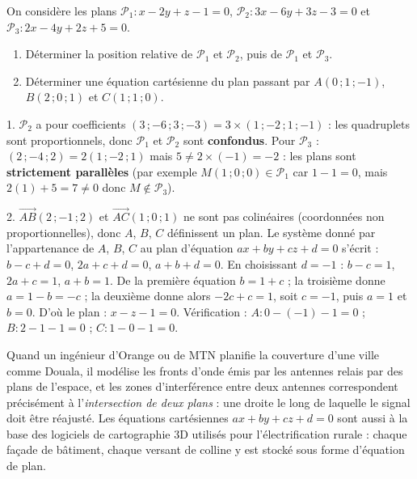 \documentclass[11pt]{article}
\begin{document}
\begin{exercice}
On considère les plans $\mathcal{P}_1 : x - 2y + z - 1 = 0$, $\mathcal{P}_2 : 3x - 6y + 3z - 3 = 0$ et $\mathcal{P}_3 : 2x - 4y + 2z + 5 = 0$.
\begin{enumerate}
\item Déterminer la position relative de $\mathcal{P}_1$ et $\mathcal{P}_2$, puis de $\mathcal{P}_1$ et $\mathcal{P}_3$.
\item Déterminer une équation cartésienne du plan passant par $A(0\,;1\,;-1)$, $B(2\,;0\,;1)$ et $C(1\,;1\,;0)$.
\end{enumerate}
\end{exercice}

\begin{corrige}[Exercice 1]
1. $\mathcal{P}_2$ a pour coefficients $(3\,;-6\,;3\,;-3) = 3 \times (1\,;-2\,;1\,;-1)$ : les quadruplets sont proportionnels, donc $\mathcal{P}_1$ et $\mathcal{P}_2$ sont \textbf{confondus}. Pour $\mathcal{P}_3$ : $(2\,;-4\,;2) = 2(1\,;-2\,;1)$ mais $5 \neq 2 \times (-1) = -2$ : les plans sont \textbf{strictement parallèles} (par exemple $M(1\,;0\,;0) \in \mathcal{P}_1$ car $1 - 1 = 0$, mais $2(1) + 5 = 7 \neq 0$ donc $M \notin \mathcal{P}_3$).

2. $\overrightarrow{AB}(2\,;-1\,;2)$ et $\overrightarrow{AC}(1\,;0\,;1)$ ne sont pas colinéaires (coordonnées non proportionnelles), donc $A$, $B$, $C$ définissent un plan. Le système donné par l'appartenance de $A$, $B$, $C$ au plan d'équation $ax + by + cz + d = 0$ s'écrit : $b - c + d = 0$, $2a + c + d = 0$, $a + b + d = 0$. En choisissant $d = -1$ : $b - c = 1$, $2a + c = 1$, $a + b = 1$. De la première équation $b = 1 + c$ ; la troisième donne $a = 1 - b = -c$ ; la deuxième donne alors $-2c + c = 1$, soit $c = -1$, puis $a = 1$ et $b = 0$. D'où le plan : $x - z - 1 = 0$. Vérification : $A : 0 - (-1) - 1 = 0$ ; $B : 2 - 1 - 1 = 0$ ; $C : 1 - 0 - 1 = 0$.
\end{corrige}

\begin{savaistu}
Quand un ingénieur d'Orange ou de MTN planifie la couverture d'une ville comme Douala, il modélise les fronts d'onde émis par les antennes relais par des plans de l'espace, et les zones d'interférence entre deux antennes correspondent précisément à l'\emph{intersection de deux plans} : une droite le long de laquelle le signal doit être réajusté. Les équations cartésiennes $ax + by + cz + d = 0$ sont aussi à la base des logiciels de cartographie 3D utilisés pour l'électrification rurale : chaque façade de bâtiment, chaque versant de colline y est stocké sous forme d'équation de plan.
\end{savaistu}
\end{document}
